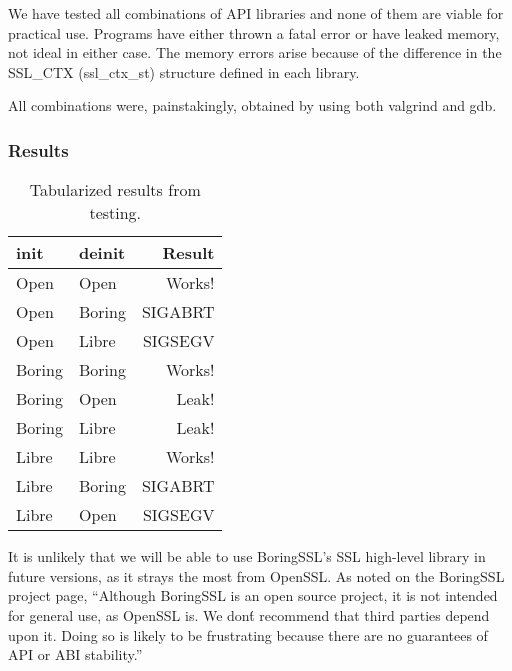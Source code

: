 \documentclass{acm_proc_article-sp}
\begin{document}
We have tested all combinations of API libraries and none of them are
viable for practical use. Programs have either thrown a fatal error or have
leaked memory, not ideal in either case. The memory errors arise because of the
difference in the SSL\_CTX (ssl\_ctx\_st) structure defined in each library.

All combinations were, painstakingly, obtained by using both valgrind and gdb.

\subsubsection{Results}\label{Sec:Res}

\begin{table}
\begin{center}
    \begin{tabular}{ l | l | r }
      \textbf{init}       &       \textbf{deinit} &       \textbf{Result}  \\
      \hline
      Open                &       Open            &       Works!\\
      Open                &       Boring            &       SIGABRT\\
      Open                &       Libre            &       SIGSEGV\\
      \rowcolor{gray!25}
      Boring                &       Boring            &       Works!\\
      \rowcolor{gray!25}
      Boring                &       Open            &       Leak!\\
      \rowcolor{gray!25}
      Boring                &       Libre            &       Leak!\\
      \rowcolor{gray!50}
      Libre                &       Libre            &       Works!\\
      \rowcolor{gray!50}
      Libre                &       Boring            &       SIGABRT\\
      \rowcolor{gray!50}
      Libre                &       Open            &       SIGSEGV\\
    \end{tabular}
    \caption{Tabularized results from testing.}
\end{center}
\end{table}

It is unlikely that we will be able to use BoringSSL's SSL high-level
library in future versions, as it strays the most from OpenSSL. As noted
on the BoringSSL project page, ``Although BoringSSL is an open source project,
it is not intended for general use, as OpenSSL is. We don\'t recommend that
third parties depend upon it. Doing so is likely to be frustrating because there
are no guarantees of API or ABI stability.''\cite{boringssl}
\end{document}

